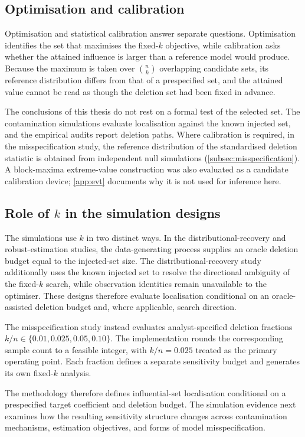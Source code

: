 \documentclass[../main.tex]{subfiles}
\begin{document}
\subsection{Optimisation and calibration}
\label{subsec:evt_fixed_k}

Optimisation and statistical calibration answer separate questions. Optimisation identifies the set that maximises the fixed-\(k\) objective, while calibration asks whether the attained influence is larger than a reference model would produce. Because the maximum is taken over \(\binom{n}{k}\) overlapping candidate sets, its reference distribution differs from that of a prespecified set, and the attained value cannot be read as though the deletion set had been fixed in advance.

The conclusions of this thesis do not rest on a formal test of the selected set. The contamination simulations evaluate localisation against the known injected set, and the empirical audits report deletion paths. Where calibration is required, in the misspecification study, the reference distribution of the standardised deletion statistic is obtained from independent null simulations (\autoref{subsec:misspecification}). A block-maxima extreme-value construction \parencite{konrad2026testing} was also evaluated as a candidate calibration device; \autoref{app:evt} documents why it is not used for inference here.

\subsection{Role of \texorpdfstring{$k$}{k} in the simulation designs}
\label{subsec:k_simulation_role}

The simulations use \(k\) in two distinct ways. In the distributional-recovery and robust-estimation studies, the data-generating process supplies an oracle deletion budget equal to the injected-set size. The distributional-recovery study additionally uses the known injected set to resolve the directional ambiguity of the fixed-\(k\) search, while observation identities remain unavailable to the optimiser. These designs therefore evaluate localisation conditional on an oracle-assisted deletion budget and, where applicable, search direction.

The misspecification study instead evaluates analyst-specified deletion fractions \(k/n\in\{0.01,0.025,0.05,0.10\}\). The implementation rounds the corresponding sample count to a feasible integer, with \(k/n=0.025\) treated as the primary operating point. Each fraction defines a separate sensitivity budget and generates its own fixed-\(k\) analysis.

The methodology therefore defines influential-set localisation conditional on a prespecified target coefficient and deletion budget. The simulation evidence next examines how the resulting sensitivity structure changes across contamination mechanisms, estimation objectives, and forms of model misspecification.
\end{document}
